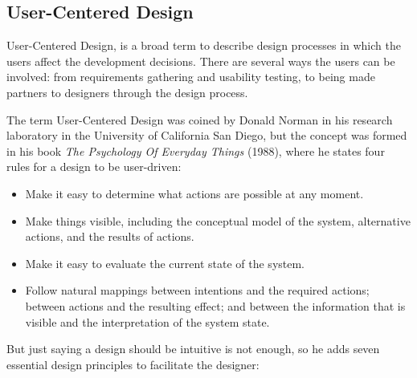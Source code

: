 \documentclass[runningheads]{llncs}
\begin{document}
\subsection{User-Centered Design}
\par User-Centered Design, is a broad term to describe design processes in which the users affect the development decisions. There are several ways the users can be involved: from requirements gathering and usability testing, to being made partners to designers through the design process.
\par The term User-Centered Design was coined by Donald Norman in his research laboratory in the University of California San Diego, but the concept was formed in his book \textit{The Psychology Of Everyday Things} (1988), where he states four rules for a design to be user-driven:
\begin{itemize}
    \item Make it easy to determine what actions are possible at any moment.
    \item Make things visible, including the conceptual model of the system, alternative actions, and the results of actions. 
    \item Make it easy to evaluate the current state of the system.
    \item Follow natural mappings between intentions and the required actions; between actions and the resulting effect; and between the information that is visible and the interpretation of the system state.
\end{itemize}
\par But just saying a design should be intuitive is not enough, so he adds seven essential design principles to facilitate the designer:
\end{document}

